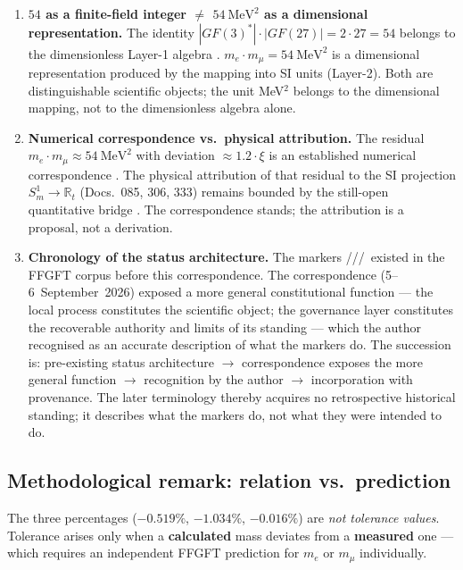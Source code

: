 \begin{enumerate}\itemsep4pt
\item \textbf{$54$ as a finite-field integer $\neq$ $54~\text{MeV}^2$ as a dimensional representation.}
  The identity $|GF(3)^*|\cdot|GF(27)|=2\cdot27=54$ belongs to the dimensionless Layer-1 algebra \BM.
  $m_e\cdot m_\mu=54~\text{MeV}^2$ is a dimensional representation produced by the mapping into
  SI units (Layer-2). Both are distinguishable scientific objects;
  the unit MeV$^2$ belongs to the dimensional mapping, not to the dimensionless algebra alone.

\item \textbf{Numerical correspondence vs.\ physical attribution.}
  The residual $m_e\cdot m_\mu\approx54~\text{MeV}^2$ with deviation $\approx1.2\cdot\xi$
  is an established numerical correspondence \KM.
  The physical attribution of that residual to the SI projection
  $S^1_m\to\mathbb{R}_t$ (Docs.~085, 306, 333) remains bounded by the still-open
  quantitative bridge \SM.
  The correspondence stands; the attribution is a proposal, not a derivation.

\item \textbf{Chronology of the status architecture.}
  The markers \BM/\KM/\SM/\QM\ existed in the FFGFT corpus before this correspondence.
  The correspondence (5--6~September~2026) exposed a more general constitutional
  function --- the local process constitutes the scientific object; the governance
  layer constitutes the recoverable authority and limits of its standing --- which
  the author recognised as an accurate description of what the markers do. The
  succession is: pre-existing status architecture $\to$ correspondence exposes the
  more general function $\to$ recognition by the author $\to$ incorporation with
  provenance. The later terminology thereby acquires no retrospective historical
  standing; it describes what the markers do, not what they were intended to do.
\end{enumerate}


\subsection*{Methodological remark: relation vs.\ prediction}

The three percentages ($-0.519\%$, $-1.034\%$, $-0.016\%$) are
\emph{not tolerance values}. Tolerance arises only when a
\textbf{calculated} mass deviates from a \textbf{measured} one ---
which requires an independent FFGFT prediction for $m_e$ or $m_\mu$
individually.


